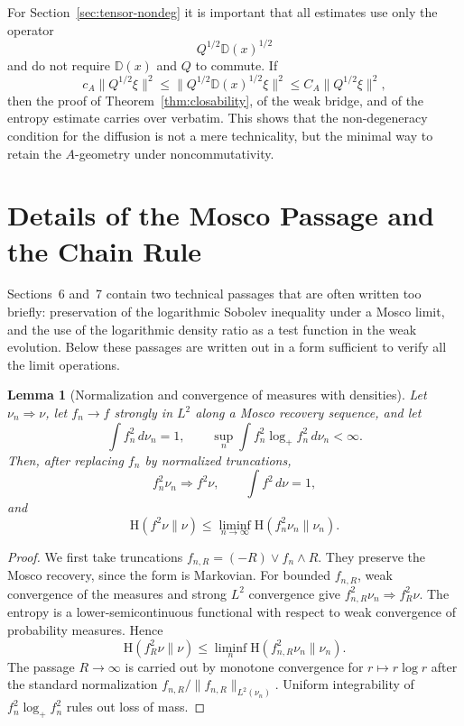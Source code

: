 \documentclass{article}
\newtheorem{lemma}[theorem]{Lemma}
\newcommand{\Ent}{\mathrm H}
\begin{document}
For Section~\ref{sec:tensor-nondeg} it is important that all estimates use only
the operator
\[
        Q^{1/2}\mathbb D(x)^{1/2}
\]
and do not require \(\mathbb D(x)\) and \(Q\) to commute. If
\[
        c_A\|Q^{1/2}\xi\|^2
        \le
        \|Q^{1/2}\mathbb D(x)^{1/2}\xi\|^2
        \le
        C_A\|Q^{1/2}\xi\|^2 ,
\]
then the proof of Theorem~\ref{thm:closability}, of the weak bridge, and of
the entropy estimate carries over verbatim. This shows that the non-degeneracy
condition for the diffusion is not a mere technicality, but the minimal
way to retain the \(A\)-geometry under noncommutativity.

\section{Details of the Mosco Passage and the Chain Rule}
\label{sec:mosco-chain-details}

Sections~6 and~7 contain two technical passages that are often written too
briefly: preservation of the logarithmic Sobolev inequality under a Mosco
limit, and the use of the logarithmic density ratio as a test function in the
weak evolution. Below these passages are written out in a form sufficient to
verify all the limit operations.

\begin{lemma}[Normalization and convergence of measures with densities]
\label{lem:entropy-lsc-density}
Let \(\nu_n\Rightarrow\nu\), let \(f_n\to f\) strongly in \(L^2\) along a
Mosco recovery sequence, and let
\[
        \int f_n^2\,d\nu_n=1,\qquad
        \sup_n\int f_n^2\log_+ f_n^2\,d\nu_n<\infty .
\]
Then, after replacing \(f_n\) by normalized truncations,
\[
        f_n^2\nu_n\Rightarrow f^2\nu,\qquad
        \int f^2\,d\nu=1,
\]
and
\[
        \Ent(f^2\nu\|\nu)
        \le
        \liminf_{n\to\infty}\Ent(f_n^2\nu_n\|\nu_n).
\]
\end{lemma}

\begin{proof}
We first take truncations \(f_{n,R}=(-R)\vee f_n\wedge R\). They preserve the
Mosco recovery, since the form is Markovian. For bounded \(f_{n,R}\), weak
convergence of the measures and strong \(L^2\) convergence give
\(f_{n,R}^2\nu_n\Rightarrow f_R^2\nu\). The entropy is a lower-semicontinuous
functional with respect to weak convergence of probability measures. Hence
\[
        \Ent(f_R^2\nu\|\nu)
        \le
        \liminf_n\Ent(f_{n,R}^2\nu_n\|\nu_n).
\]
The passage \(R\to\infty\) is carried out by monotone convergence for
\(r\mapsto r\log r\) after the standard normalization
\(f_{n,R}/\|f_{n,R}\|_{L^2(\nu_n)}\). Uniform integrability of
\(f_n^2\log_+f_n^2\) rules out loss of mass.
\end{proof}
\end{document}
